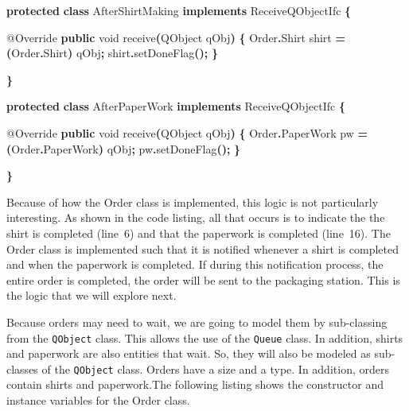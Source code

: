 \documentclass[
]{book}
\newenvironment{Shaded}{\begin{snugshade}}{\end{snugshade}}
\newcommand{\AttributeTok}[1]{\textcolor[rgb]{0.77,0.63,0.00}{#1}}
\newcommand{\DataTypeTok}[1]{\textcolor[rgb]{0.13,0.29,0.53}{#1}}
\newcommand{\FunctionTok}[1]{\textcolor[rgb]{0.00,0.00,0.00}{#1}}
\newcommand{\KeywordTok}[1]{\textcolor[rgb]{0.13,0.29,0.53}{\textbf{#1}}}
\newcommand{\NormalTok}[1]{#1}
\newcommand{\OperatorTok}[1]{\textcolor[rgb]{0.81,0.36,0.00}{\textbf{#1}}}
\theoremstyle{definition}
\theoremstyle{definition}
\theoremstyle{definition}
\theoremstyle{definition}
\theoremstyle{remark}
\begin{document}
\begin{Shaded}
\begin{Highlighting}[]
    \KeywordTok{protected} \KeywordTok{class}\NormalTok{ AfterShirtMaking }\KeywordTok{implements}\NormalTok{ ReceiveQObjectIfc }\OperatorTok{\{}

        \AttributeTok{@Override}
        \KeywordTok{public} \DataTypeTok{void} \FunctionTok{receive}\OperatorTok{(}\NormalTok{QObject qObj}\OperatorTok{)} \OperatorTok{\{}
\NormalTok{            Order}\OperatorTok{.}\FunctionTok{Shirt}\NormalTok{ shirt }\OperatorTok{=} \OperatorTok{(}\NormalTok{Order}\OperatorTok{.}\FunctionTok{Shirt}\OperatorTok{)}\NormalTok{ qObj}\OperatorTok{;}
\NormalTok{            shirt}\OperatorTok{.}\FunctionTok{setDoneFlag}\OperatorTok{();}
        \OperatorTok{\}}

    \OperatorTok{\}}

    \KeywordTok{protected} \KeywordTok{class}\NormalTok{ AfterPaperWork }\KeywordTok{implements}\NormalTok{ ReceiveQObjectIfc }\OperatorTok{\{}

        \AttributeTok{@Override}
        \KeywordTok{public} \DataTypeTok{void} \FunctionTok{receive}\OperatorTok{(}\NormalTok{QObject qObj}\OperatorTok{)} \OperatorTok{\{}
\NormalTok{            Order}\OperatorTok{.}\FunctionTok{PaperWork}\NormalTok{ pw }\OperatorTok{=} \OperatorTok{(}\NormalTok{Order}\OperatorTok{.}\FunctionTok{PaperWork}\OperatorTok{)}\NormalTok{ qObj}\OperatorTok{;}
\NormalTok{            pw}\OperatorTok{.}\FunctionTok{setDoneFlag}\OperatorTok{();}
        \OperatorTok{\}}

    \OperatorTok{\}}
\end{Highlighting}
\end{Shaded}

Because of how the Order class is
implemented, this logic is not particularly interesting. As shown in the
code listing, all that occurs is to indicate the the shirt is completed
(line~6) and that the paperwork is completed (line~16). The Order class
is implemented such that it is notified whenever a shirt is completed
and when the paperwork is completed. If during this notification
process, the entire order is completed, the order will be sent to the
packaging station. This is the logic that we will explore next.

Because orders may need to wait, we are going to model them by
sub-classing from the \texttt{QObject} class. This allows the use of the \texttt{Queue}
class. In addition, shirts and paperwork are also entities that wait.
So, they will also be modeled as sub-classes of the \texttt{QObject} class.
Orders have a size and a type. In addition, orders contain shirts and
paperwork.The following listing shows the constructor and instance variables
for the Order class.
\end{document}
